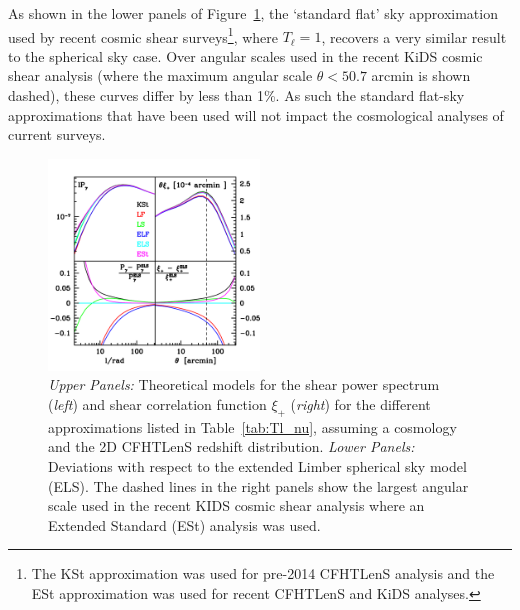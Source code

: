 As shown in the lower panels of Figure~\ref{fig:Cl_xi}, the `standard flat' sky approximation used by recent cosmic shear surveys\footnote{The KSt approximation was used for pre-2014 CFHTLenS analysis and the ESt approximation was used for recent CFHTLenS and KiDS analyses.}, where $T_\ell = 1$, recovers a very similar result to the spherical sky case.  Over angular scales used in the recent KiDS cosmic shear analysis (where the maximum angular scale $\theta<50.7$ arcmin is shown dashed), these curves differ by less than 1\%.  As such the standard flat-sky approximations that have been used will not impact the cosmological analyses of current surveys.
 
 \begin{figure}
 \begin{center}
 \includegraphics[width=0.5\textwidth]{figures/Cl_xi_comp.pdf}
 \caption{ \label{fig:Cl_xi}\emph{Upper Panels:} Theoretical models for the shear power spectrum (\emph{left}) and shear correlation function $\xi_+$ (\emph{right}) for the different approximations listed in Table~\ref{tab:Tl_nu}, assuming a \citet{planck/cosmo:2015} cosmology and the 2D CFHTLenS redshift distribution. \emph{Lower Panels:} Deviations with respect to the extended Limber spherical sky model (ELS).    The dashed lines in the right panels show the largest angular scale used in the recent KIDS cosmic shear analysis where an Extended Standard (ESt) analysis was used.}
 \end{center}
 \end{figure}
 
